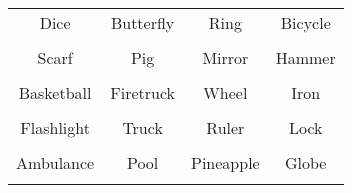 \documentclass[12pt,a4paper]{article}
\begin{document}
\thispagestyle{empty}
\begin{table}[]
\centering
\Huge
\begin{tabular}{cccc}
 Dice& Butterfly& Ring& Bicycle\\  & & & \\
 Scarf& Pig& Mirror& Hammer\\  & & & \\
 Basketball& Firetruck& Wheel& Iron\\  & & & \\
 Flashlight& Truck& Ruler& Lock\\  & & & \\
 Ambulance& Pool& Pineapple& Globe\\  & & & \\
\end{tabular}
\end{table}
\end{document}
